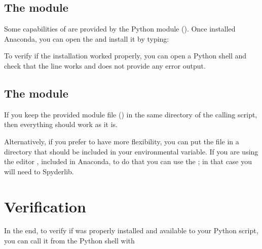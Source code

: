 \documentclass[letterpaper,10pt,english]{sphinxmanual}
\begin{document}
\subsection{The  module}
\label{\detokenize{install:the-anytree-module}}
Some capabilities of  are provided by the Python 
module (). Once installed Anaconda, you can open the  and install it by typing:

\begin{sphinxVerbatim}[commandchars=\\\{\}]
  
\end{sphinxVerbatim}

To verify if the installation worked properly, you can open a Python
shell and check that the line  works and does not
provide any error output.


\subsection{The  module}
\label{\detokenize{install:the-hiegeo-module}}
If you keep the provided module file () in the same
directory of the calling script, then everything should work as it is.

Alternatively, if you prefer to have more flexibility, you can put the
file  in a directory that should be included in your
 environmental variable. If you are using the editor
, included in Anaconda, to do that you can use the ; in that case you will need to  Spyderlib.


\section{Verification}
\label{\detokenize{install:verification}}
In the end, to verify if  was properly installed and
available to your Python script, you can call it from the Python shell with

\begin{sphinxVerbatim}[commandchars=\\\{\}]
 
\end{sphinxVerbatim}
\end{document}
